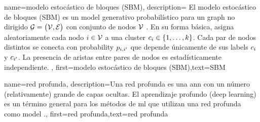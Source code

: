 {{
{
	name=modelo estocástico de bloques (SBM),
	description={
		El modelo estocástico de bloques (SBM) es un \gls{model} generativo probabilístico para un \gls{graph} no dirigido $\mathcal{G} = \big( \mathcal{V}, \mathcal{E} \big)$ con conjunto de nodos $\mathcal{V}$ \cite{AbbeSBM2018}.
		En su forma básica, asigna aleatoriamente cada nodo $i \in \mathcal{V}$ a una \gls{cluster} $c_{i} \in \{1,\ldots,k\}$.
		Cada par de nodos distintos se conecta con \gls{probability} $p_{i,i'}$ que depende únicamente de sus \gls{label}s $c_{i}$ y $c_{i'}$.
		La presencia de aristas entre pares de nodos es estadísticamente independiente.
	},
	first={modelo estocástico de bloques (SBM)},text={SBM}
}


{name={red profunda},
	description={Una red profunda es una \gls{ann} con un número (relativamente) grande 
	de capas ocultas. El aprendizaje profundo (deep learning) es un término general para los métodos de \gls{ml} 
	que utilizan una red profunda como \gls{model}  \cite{Goodfellow-et-al-2016}.},
	first={red profunda},text={red profunda} 
}

\newcommand{\gaussiancenter}{3}

}}
